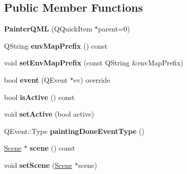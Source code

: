 \subsection*{Public Member Functions}
\begin{DoxyCompactItemize}
\item 
\hypertarget{class_painter_q_m_l_a6ce68afc41c75b1fc74da16890d9f797}{}{\bfseries Painter\+Q\+M\+L} (Q\+Quick\+Item $\ast$parent=0)\label{class_painter_q_m_l_a6ce68afc41c75b1fc74da16890d9f797}

\item 
\hypertarget{class_painter_q_m_l_af5c04e89584445a002e7a86d6ab071c3}{}Q\+String {\bfseries env\+Map\+Prefix} () const \label{class_painter_q_m_l_af5c04e89584445a002e7a86d6ab071c3}

\item 
\hypertarget{class_painter_q_m_l_a65bd9e19f9b6b1bd197c34d3a9174f04}{}void {\bfseries set\+Env\+Map\+Prefix} (const Q\+String \&env\+Map\+Prefix)\label{class_painter_q_m_l_a65bd9e19f9b6b1bd197c34d3a9174f04}

\item 
\hypertarget{class_painter_q_m_l_a69fecccc6056c3ee957219ffd63c193c}{}bool {\bfseries event} (Q\+Event $\ast$ev) override\label{class_painter_q_m_l_a69fecccc6056c3ee957219ffd63c193c}

\item 
\hypertarget{class_painter_q_m_l_a391bd3c26f57dfcb3177318595c89353}{}bool {\bfseries is\+Active} () const \label{class_painter_q_m_l_a391bd3c26f57dfcb3177318595c89353}

\item 
\hypertarget{class_painter_q_m_l_a242301828022a572c1f1b72eb3ecd9e5}{}void {\bfseries set\+Active} (bool active)\label{class_painter_q_m_l_a242301828022a572c1f1b72eb3ecd9e5}

\item 
\hypertarget{class_painter_q_m_l_a7715bb2f3d638ff3d5e6e602a427b413}{}Q\+Event\+::\+Type {\bfseries painting\+Done\+Event\+Type} ()\label{class_painter_q_m_l_a7715bb2f3d638ff3d5e6e602a427b413}

\item 
\hypertarget{class_painter_q_m_l_a6694ad2cfda4aefaffc0a3151a2b09dd}{}\hyperlink{class_scene}{Scene} $\ast$ {\bfseries scene} () const \label{class_painter_q_m_l_a6694ad2cfda4aefaffc0a3151a2b09dd}

\item 
\hypertarget{class_painter_q_m_l_a81288bcb25e5b985eea33b26ede7931a}{}void {\bfseries set\+Scene} (\hyperlink{class_scene}{Scene} $\ast$scene)\label{class_painter_q_m_l_a81288bcb25e5b985eea33b26ede7931a}

\end{DoxyCompactItemize}
